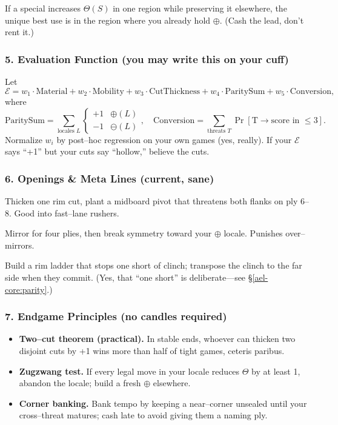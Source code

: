 \documentclass[11pt]{article}
\begin{document}
\begin{itemize}
\begin{theorem}
If a special increases \(\Theta(S)\) in one region while preserving it elsewhere, the unique best use is in the region where you already hold \(\oplus\). (Cash the lead, don’t rent it.)
\end{theorem}

\subsubsection{5. Evaluation Function (you may write this on your cuff)}
Let 
\[
\mathcal{E} = w_1 \cdot \text{Material} + w_2 \cdot \text{Mobility} + w_3 \cdot \text{CutThickness} + w_4 \cdot \text{ParitySum} + w_5 \cdot \text{Conversion},
\]
where
\[
\text{ParitySum}=\sum_{\text{locales }L} \begin{cases}+1 & \oplus(L)\\ -1 & \ominus(L)\end{cases}, \quad
\text{Conversion}=\sum_{\text{threats }T}\Pr[\text{T}\to\text{score in }\le 3].
\]
Normalize \(w_i\) by post–hoc regression on your own games (yes, really). If your \(\mathcal{E}\) says “+1” but your cuts say “hollow,” believe the cuts.

\subsubsection{6. Openings \& Meta Lines (current, sane)}
\begin{description}\setlength\itemsep{0.35em}
  \item[\textit{Cage \& Pivot.}] Thicken one rim cut, plant a midboard pivot that threatens both flanks on ply 6–8. Good into fast–lane rushers.
  \item[\textit{Mirror–Then–Shiver.}] Mirror for four plies, then break symmetry toward your \(\oplus\) locale. Punishes over–mirrors.
  \item[\textit{Ladder–to–Ladder.}] Build a rim ladder that stops one short of clinch; transpose the clinch to the far side when they commit. (Yes, that “one short” is deliberate—see \S\ref{ael-core:parity}.)
\end{description}

\subsubsection{7. Endgame Principles (no candles required)}
\begin{itemize}\setlength\itemsep{0.25em}
  \item \textbf{Two–cut theorem (practical).} In stable ends, whoever can thicken two disjoint cuts by +1 wins more than half of tight games, ceteris paribus.
  \item \textbf{Zugzwang test.} If every legal move in your locale reduces \(\Theta\) by at least 1, abandon the locale; build a fresh \(\oplus\) elsewhere.
  \item \textbf{Corner banking.} Bank tempo by keeping a near–corner unsealed until your cross–threat matures; cash late to avoid giving them a naming ply.
\end{itemize}


\end{itemize}
\end{document}
